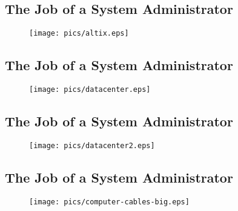 \documentclass[xga]{xdvislides}
\begin{document}
\subsection{The Job of a System Administrator}
\vspace*{\fill}
\begin{figure}[hb]
	\begin{center}
		\texttt{[image: pics/altix.eps]} \\
	\end{center}
\end{figure}
\vspace*{\fill}

\subsection{The Job of a System Administrator}
\vspace*{\fill}
\begin{figure}[hb]
	\begin{center}
		\texttt{[image: pics/datacenter.eps]} \\
	\end{center}
\end{figure}
\vspace*{\fill}

\subsection{The Job of a System Administrator}
\vspace*{\fill}
\begin{figure}[hb]
	\begin{center}
		\texttt{[image: pics/datacenter2.eps]} \\
	\end{center}
\end{figure}
\vspace*{\fill}



\subsection{The Job of a System Administrator}
\vspace*{\fill}
\begin{figure}[hb]
	\begin{center}
		\texttt{[image: pics/computer-cables-big.eps]} \\
	\end{center}
\end{figure}
\vspace*{\fill}
\end{document}
